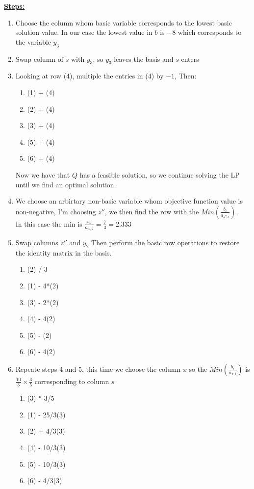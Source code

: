 \documentclass{article}
\numberwithin{equation}{subsection}
\begin{document}
	\vspace{15pt}
	\textbf{\underline{Steps:}}
	\begin{enumerate}
		\item Choose the column whom basic variable corresponds to the lowest
			basic solution value. In our case the lowest value in $b$ is $-8$
			which corresponds to the variable $y_3$
		\item Swap column of $s$ with $y_3$, so $y_3$ leaves the basis and $s$ enters
		\item Looking at row (4), multiple the entries in (4)  by $-1$, Then:
			\begin{enumerate}
				\item (1) + (4)
				\item (2) + (4)
				\item (3) + (4)
				\item (5) + (4)
				\item (6) + (4)
			\end{enumerate}
			Now we have that $Q$ has a feasible solution, so we continue solving the 
			LP until we find an optimal solution.

		\item We choose an arbirtary non-basic variable whom objective function
			value is non-negative, I'm choosing $z''$, we then find the row with 
			the $Min(\frac{b_i}{a_{z'',i}})$.\\ 
			In this case the min is $\frac{b_5}{a_{w,2}} = \frac{7}{3} = 2.333$ 

		\item Swap columns $z''$ and $y_2$ Then perform the basic row operations to restore the 
			identity matrix in the basis.
			\begin{enumerate}
				\item (2) / 3
				\item (1) - 4*(2) 
				\item (3) - 2*(2)
				\item (4) - 4(2)
				\item (5) - (2)
				\item (6) - 4(2)

			\end{enumerate}

		\item Repeate steps 4 and 5, this time we choose the column $x$ so the 
			$Min(\frac{b_i}{a_{x,i}})$ is $\frac{10}{3}\times \frac{3}{5}$ 
			corresponding to column $s$

			\begin{enumerate}
				\item (3) * 3/5
				\item (1) - 25/3(3)
				\item (2) + 4/3(3)
				\item (4) - 10/3(3)
				\item (5) - 10/3(3)
				\item (6) - 4/3(3)
			\end{enumerate}


\end{enumerate}
\end{document}

